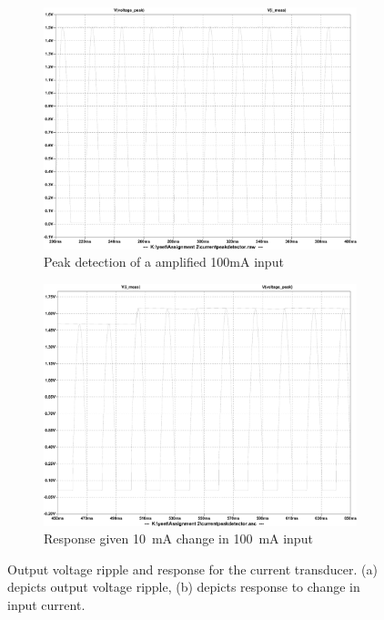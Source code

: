 \begin{figure}[h!]
 \centering
     \begin{subfigure}[]{0.49\textwidth}
        \centering
         \includegraphics[width=1\linewidth]{./Figures/currentpeakdetectoroutputsim.pdf}
		    \caption{Peak detection of a amplified 100mA input} \label{subfig:currenttransducer100maripple}
     \end{subfigure}
      \begin{subfigure}[]{0.49\textwidth}
              \centering
  		\includegraphics[width=1\linewidth]{./Figures/currentpeakdetectoroutputchange.pdf}
		    \caption{Response given \SI{10}{mA} change in \SI{100}{mA} input} \label{subfig:currenttransducerinputchange}
     \end{subfigure}
   \caption[Simulated results for the current transducer]{Output voltage ripple and response for the current transducer. (a) depicts output voltage ripple, (b) depicts response to change in input current. }
    \label{fig:current_simulation_results_box_sim}
 \end{figure}

